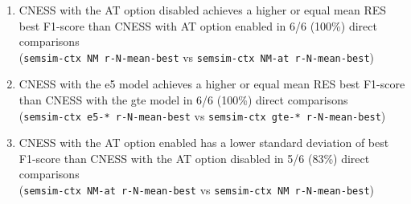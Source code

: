 \documentclass[11pt]{scrreprt}
\newcounter{listcounter}
\begin{document}
\begin{enumerate}[label=\arabic{listcounter}.\arabic*]
	\item CNESS with the AT option disabled achieves a higher or equal mean RES best F1-score than CNESS with AT option enabled in 6/6 (100\%) direct comparisons \\(\texttt{semsim-ctx NM r-N-mean-best} vs \texttt{semsim-ctx NM-at r-N-mean-best}) \label{obs-itm:CNESS-better-without-AT}
	\item CNESS with the e5 model achieves a higher or equal mean RES best F1-score than CNESS with the gte model in 6/6 (100\%) direct comparisons \\ (\texttt{semsim-ctx e5-* r-N-mean-best} vs \texttt{semsim-ctx gte-* r-N-mean-best}) \label{obs-itm:CNESS-e5-better-than-gte}
	\item CNESS with the AT option enabled has a lower standard deviation of best F1-score than CNESS with the AT option disabled in 5/6 (83\%) direct comparisons \\ (\texttt{semsim-ctx NM-at r-N-mean-best} vs \texttt{semsim-ctx NM r-N-mean-best}) \label{obs-itm:CNESS-lower-variation-with-AT}
\end{enumerate}
\end{document}
